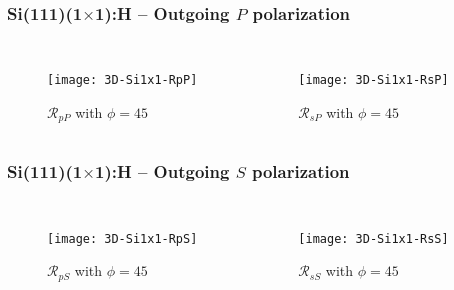 \documentclass{beamer}
\begin{document}
\begin{frame}
\frametitle{Si(111)(1\texorpdfstring{$\times$}{x}1):H -- Outgoing
\texorpdfstring{$P$}{P} polarization}
\begin{columns}
\begin{figure}
\centering
\texttt{[image: 3D-Si1x1-RpP]}
\caption{$\mathcal{R}_{pP}$ with $\phi=45$}
\end{figure}
\begin{figure}
\centering
\texttt{[image: 3D-Si1x1-RsP]}
\caption{$\mathcal{R}_{sP}$ with $\phi=45$}
\end{figure}
\end{columns}
\end{frame}

\begin{frame}
\frametitle{Si(111)(1\texorpdfstring{$\times$}{x}1):H -- Outgoing
\texorpdfstring{$S$}{S} polarization}
\begin{columns}
\begin{figure}
\centering
\texttt{[image: 3D-Si1x1-RpS]}
\caption{$\mathcal{R}_{pS}$ with $\phi=45$}
\end{figure}
\begin{figure}
\centering
\texttt{[image: 3D-Si1x1-RsS]}
\caption{$\mathcal{R}_{sS}$ with $\phi=45$}
\end{figure}
\end{columns}
\end{frame}
\end{document}
